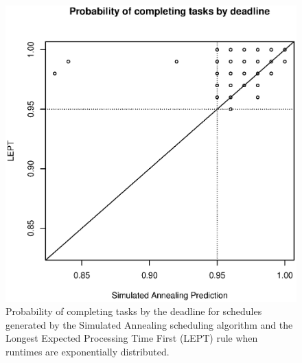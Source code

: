 \documentclass[12pt]{report}
\begin{document}
\begin{figure}
\includegraphics[width=1\textwidth]{validate-SA-LEPT-scores-2inst-100iter-10tasks.eps}
\caption{Probability of completing tasks by the deadline for schedules generated by the Simulated Annealing scheduling algorithm and the Longest Expected Processing Time First (LEPT) rule when runtimes are exponentially distributed.}
\label{fig:validate-SA-LEPT-scores-2inst-100iter-10tasks}
\end{figure}
\end{document}
